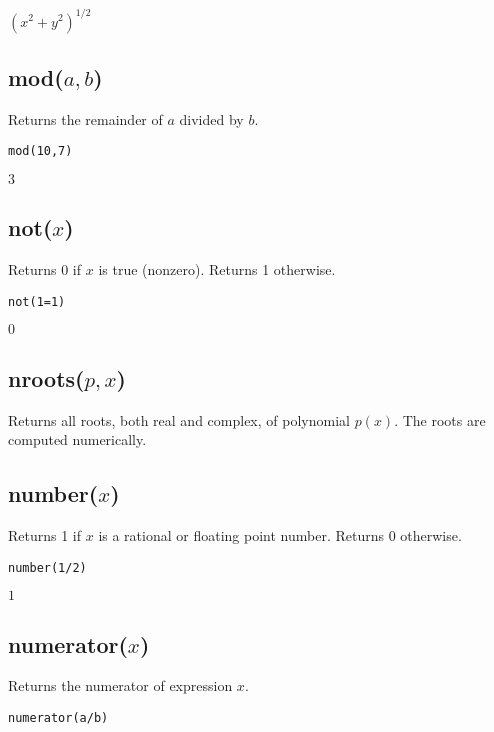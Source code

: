 \noindent
$\displaystyle (x^2+y^2)^{1/2}$

\subsection*{mod($a,b$)}

Returns the remainder of $a$ divided by $b$.

{\color{blue}
\begin{verbatim}
mod(10,7)
\end{verbatim}
}

\noindent
$3$

\subsection*{not($x$)}

Returns 0 if $x$ is true (nonzero).
Returns 1 otherwise.

{\color{blue}
\begin{verbatim}
not(1=1)
\end{verbatim}
}

\noindent
$0$

\subsection*{nroots($p,x$)}

Returns all roots, both real and complex,
of polynomial $p(x)$.
The roots are computed numerically.

\subsection*{number($x$)}

Returns 1 if $x$ is a rational or floating point number.
Returns 0 otherwise.

{\color{blue}
\begin{verbatim}
number(1/2)
\end{verbatim}
}

\noindent
$1$

\subsection*{numerator($x$)}

Returns the numerator of expression $x$.

{\color{blue}
\begin{verbatim}
numerator(a/b)
\end{verbatim}
}

